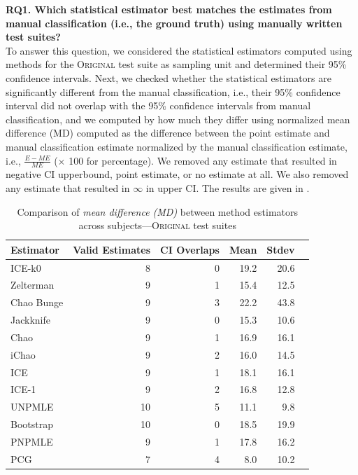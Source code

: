 \documentclass[sigconf,review,anonymous]{acmart}
\newcommand{\ICEallrare}{ICE-k0\xspace}
\newcommand{\Zelterman}{Zelterman\xspace}
\newcommand{\ChaoBunge}{Chao Bunge\xspace}
\newcommand{\Jackknife}{Jackknife\xspace}
\newcommand{\Chao}{Chao\xspace}
\newcommand{\improvedChao}{iChao\xspace}
\newcommand{\ICE}{ICE\xspace}
\newcommand{\improvedICE}{ICE-1\xspace}
\newcommand{\Unpmle}{UNPMLE\xspace}
\newcommand{\Bootstrap}{Bootstrap\xspace}
\newcommand{\Pnpmle}{PNPMLE\xspace}
\newcommand{\PCG}{PCG\xspace}
\newcommand{\original}{\textsc{Original}\xspace}
\begin{document}
\noindent\textbf{RQ1. Which statistical estimator best matches the
estimates from manual classification (i.e., the ground truth) using manually written test suites?}\\
%
To answer this question, we considered the statistical estimators computed
using methods for the \original test suite as sampling unit and determined
their 95\% confidence intervals.
%
Next, we checked whether the statistical estimators are significantly different
from the manual classification, i.e.,  their 95\% confidence interval did not overlap
with the 95\% confidence intervals from manual classification, and we computed
by how much they differ using normalized mean difference (MD) computed as the
difference between the point estimate and manual classification estimate
normalized by the manual classification estimate, i.e., $\frac{E - ME}{ME}$ ($\times$
100 for percentage). We removed any estimate that resulted in negative
CI upperbound, point estimate, or no estimate at all. We also removed any
estimate that resulted in $\infty$ in upper CI. The results are given in
.

\begin{table}
\caption{Comparison of \emph{mean difference (MD)} between method estimators
across subjects---\original test suites}
\begin{tabular}{|l|r|r|r|r|r|}
\hline

Estimator	&Valid Estimates	&CI Overlaps	&Mean	&Stdev	\\
\hline
\ICEallrare		&	8	&	0	&19.2	&	20.6\\
\Zelterman		&	9	&	1	&15.4	&	12.5\\
\ChaoBunge		&	9	&	3	&22.2	&	43.8\\
\Jackknife		&	9	&	0	&15.3	&	10.6\\
\Chao	        	&	9	&	1	&16.9	&	16.1\\
\improvedChao		&	9	&	2	&16.0	&	14.5\\
\ICE			&	9	&	1	&18.1	&	16.1\\
\improvedICE		&	9	&	2	&16.8	&	12.8\\
\Unpmle			&	10	&	5	&11.1	&	9.8\\
\Bootstrap		&	10	&	0	&18.5	&	19.9\\
\Pnpmle			&	9	&	1	&17.8	&	16.2\\
\PCG			&	7	&	4	&8.0	&	10.2\\
\hline
\end{tabular}
\label{tbl:estoriginal}
\end{table}
\end{document}

